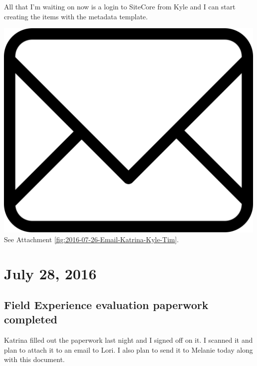 \documentclass{article}
\begin{document}
All that I'm waiting on now is a login to SiteCore from Kyle and I can start creating the items with the metadata template.

\vspace{2em}
\noindent\includegraphics[height=\fontcharht\font`\B]{icons/attachment-email} See Attachment \ref{fig:2016-07-26-Email-Katrina-Kyle-Tim}.
\vspace{2em}

\section{July 28, 2016}
\subsection{Field Experience evaluation paperwork completed}
Katrina filled out the paperwork last night and I signed off on it. I scanned it and plan to attach it to an email to Lori. I also plan to send it to Melanie today along with this document. 
\end{document}
